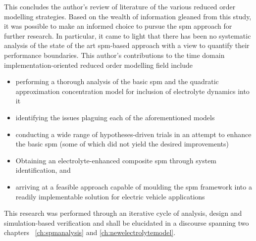This concludes  the author's review of  literature of the various  reduced order
modelling  strategies. Based  on the  wealth  of information  gleaned from  this
study,  it was  possible to  make  an informed  choice to  pursue the  \gls{spm}
approach  for further  research.  In particular,  it came  to  light that  there
has  been  no systematic  analysis  of  the  state  of the  art  \gls{spm}-based
approach with  a view  to quantify their  performance boundaries.  This author's
contributions to  the time domain  implementation-oriented reduced  order modelling
field include
\begin{itemize}[noitemsep,topsep=0pt, before={\vspace*{-0.25\baselineskip}}]
    \item performing a thorough analysis of the basic \gls{spm} and the quadratic
        approximation concentration model for inclusion of electrolyte dynamics
        into it
    \item identifying the issues plaguing each of the aforementioned models
    \item conducting a  wide range of hypotheses-driven trials in an attempt to enhance  the basic \gls{spm} (some of which did not yield the desired
        improvements)
    \item Obtaining an electrolyte-enhanced composite \gls{spm} through system
        identification, and
    \item arriving at  a  feasible  approach  capable  of  moulding  the
        \gls{spm}  framework into  a  readily implementable  solution for
        electric vehicle applications
\end{itemize}
This research was  performed through an iterative cycle of  analysis, design and
simulation-based verification  and shall be  elucidated in a  discourse spanning
two chapters \viz~\cref{ch:spmanalysis} and \cref{ch:newelectrolytemodel}.

